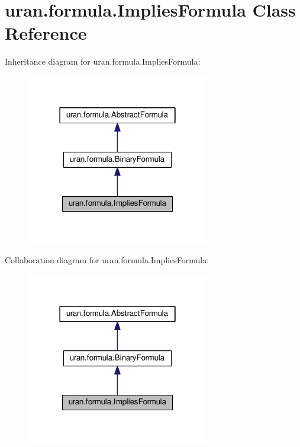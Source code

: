 \hypertarget{classuran_1_1formula_1_1_implies_formula}{}\section{uran.\+formula.\+Implies\+Formula Class Reference}
\label{classuran_1_1formula_1_1_implies_formula}


Inheritance diagram for uran.\+formula.\+Implies\+Formula\+:
\nopagebreak
\begin{figure}[H]
\begin{center}
\leavevmode
\includegraphics[width=226pt]{classuran_1_1formula_1_1_implies_formula__inherit__graph}
\end{center}
\end{figure}


Collaboration diagram for uran.\+formula.\+Implies\+Formula\+:
\nopagebreak
\begin{figure}[H]
\begin{center}
\leavevmode
\includegraphics[width=226pt]{classuran_1_1formula_1_1_implies_formula__coll__graph}
\end{center}
\end{figure}
